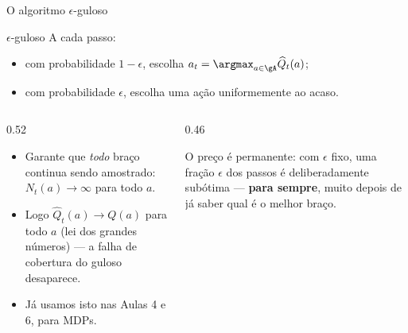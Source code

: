 \documentclass[aspectratio=169, 10pt]{beamer}
\newcommand{\Qhat}{\widehat{Q}}
\newcommand{\Nc}{N}                         %
\begin{document}
\begin{frame}{O algoritmo $\epsilon$-guloso}
  \begin{algbox}{$\epsilon$-guloso}
    A cada passo:
    \begin{itemize}\setlength{\itemsep}{0.2ex}
      \item com probabilidade $1 - \epsilon$, escolha
            $a_t = \argmax_{a \in \gA} \Qhat_t(a)$;
      \item com probabilidade $\epsilon$, escolha uma ação uniformemente
            ao acaso.
    \end{itemize}
  \end{algbox}

  \begin{columns}[T]
    \begin{column}{0.52\textwidth}
      \begin{itemize}
        \item Garante que \emph{todo} braço continua sendo amostrado:
              $\Nc_t(a) \to \infty$ para todo $a$.
        \item Logo $\Qhat_t(a) \to Q(a)$ para todo $a$ (lei dos grandes
              números) --- a falha de cobertura do guloso desaparece.
        \item Já usamos isto nas Aulas 4 e 6, para MDPs.
      \end{itemize}
    \end{column}
    \begin{column}{0.46\textwidth}
      \begin{alertabox}
        O preço é permanente: com $\epsilon$ fixo, uma fração $\epsilon$
        dos passos é deliberadamente subótima --- \textbf{para sempre},
        muito depois de já saber qual é o melhor braço.
      \end{alertabox}
    \end{column}
  \end{columns}
\end{frame}
\end{document}
